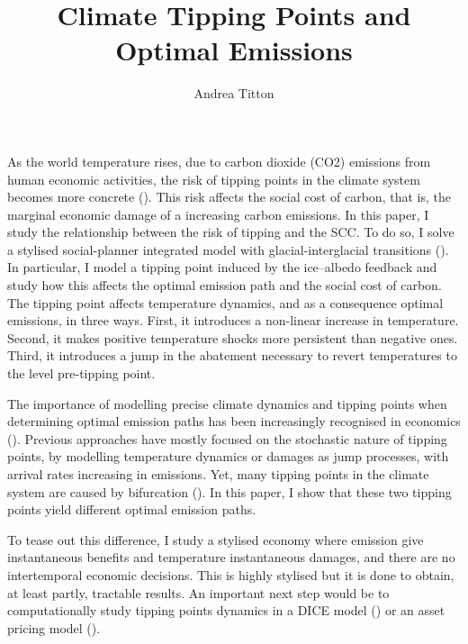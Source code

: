 \documentclass[american, abstract=on]{scrartcl}
\author{Andrea Titton}
\title{Climate Tipping Points and\\ Optimal Emissions}
\begin{document}
\maketitle

As the world temperature rises, due to carbon dioxide (CO2) emissions from human economic activities, the risk of tipping points in the climate system becomes more concrete (\cite{ashwin_extreme_2020,sledd_cloudier_2021}). This risk affects the social cost of carbon, that is, the marginal economic damage of a increasing carbon emissions. In this paper, I study the relationship between the risk of tipping and the SCC. To do so, I solve a stylised social-planner integrated model with glacial-interglacial transitions (\cite{sellers_global_1969,mcgehee_quadratic_2014}). In particular, I model a tipping point induced by the ice–albedo feedback and study how this affects the optimal emission path and the social cost of carbon. The tipping point affects temperature dynamics, and as a consequence optimal emissions, in three ways. First, it introduces a non-linear increase in temperature. Second, it makes positive temperature shocks more persistent than negative ones. Third, it introduces a jump in the abatement necessary to revert temperatures to the level pre-tipping point. 

The importance of modelling precise climate dynamics and tipping points when determining optimal emission paths has been increasingly recognised in economics (\cite{van_den_bremer_risk-adjusted_2021,dietz_economic_2021,dietz_are_2020,taconet_social_2021,lontzek_stochastic_2015}). Previous approaches have mostly focused on the stochastic nature of tipping points, by modelling temperature dynamics or damages as jump processes, with arrival rates increasing in emissions. Yet, many tipping points in the climate system are caused by bifurcation (\cite{ashwin_extreme_2020,ashwin_tipping_2012}). In this paper, I show that these two tipping points yield different optimal emission paths.

To tease out this difference, I study a stylised economy where emission give instantaneous benefits and temperature instantaneous damages, and there are no intertemporal economic decisions. This is highly stylised but it is done to obtain, at least partly, tractable results. An important next step would be to computationally study tipping points dynamics in a DICE model (\cite{nordhaus_estimates_2014,nordhaus_optimal_1992,nordhaus_question_2008,nordhaus_revisiting_2017}) or an asset pricing model (\cite{duffie_asset_1992,olijslagers_discounting_2019}).
\end{document}
